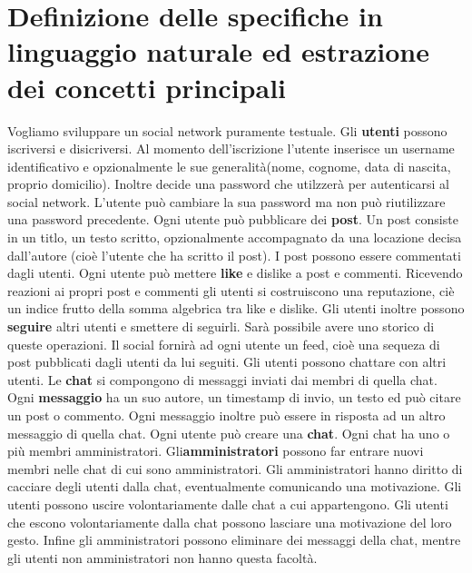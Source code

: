 \documentclass[a4paper,12pt]{report}
\begin{document}
\section{Definizione delle specifiche in linguaggio naturale ed estrazione dei concetti principali}
Vogliamo sviluppare un social network puramente testuale.
Gli \textbf{utenti} possono iscriversi e disicriversi. Al momento dell'iscrizione l'utente inserisce un username identificativo e opzionalmente le sue generalità(nome, cognome, data di nascita, proprio domicilio). Inoltre decide una password che utilzzerà per autenticarsi al social network.
L'utente può cambiare la sua password ma non può riutilizzare una password precedente.
Ogni utente può pubblicare dei \textbf{post}. Un post consiste in un titlo, un testo scritto, opzionalmente accompagnato da una locazione decisa dall'autore (cioè l'utente che ha scritto il post). I post possono essere commentati dagli utenti.
Ogni utente può mettere \textbf{like} e dislike a post e commenti. Ricevendo reazioni ai propri post e commenti gli utenti si costruiscono una reputazione, ciè un indice frutto della somma algebrica tra like e dislike.
Gli utenti inoltre possono \textbf{seguire} altri utenti e smettere di seguirli. Sarà possibile avere uno storico di queste operazioni. 
Il social fornirà ad ogni utente un feed, cioè una sequeza di post pubblicati dagli utenti da lui seguiti.
Gli utenti possono chattare con altri utenti. Le \textbf{chat} si compongono di messaggi inviati dai membri di quella chat. Ogni \textbf{messaggio} ha un suo autore, un timestamp di invio, un testo ed può citare un post o commento. Ogni messaggio inoltre può essere in risposta ad un altro messaggio di quella chat. 
Ogni utente può creare una \textbf{chat}. Ogni chat ha uno o più membri amministratori. Gli\textbf{amministratori} possono far entrare nuovi membri nelle chat di cui sono amministratori. Gli amministratori hanno diritto di cacciare degli utenti dalla chat, eventualmente comunicando una motivazione. Gli utenti possono uscire volontariamente dalle chat a cui appartengono. Gli utenti che escono volontariamente dalla chat possono lasciare una motivazione del loro gesto. 
Infine gli amministratori possono eliminare dei messaggi della chat, mentre gli utenti non amministratori non hanno questa facoltà.
\end{document}
